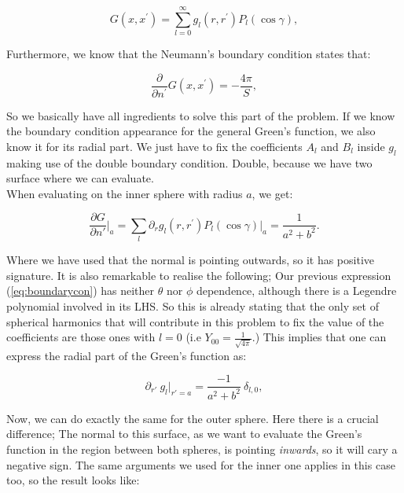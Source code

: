 \begin{equation}\label{eq:Greenfun}
	G\left(x, x^{\prime}\right)=\sum_{l=0}^{\infty} g_{l}\left(r, r^{\prime}\right) P_{l}(\cos \gamma),
\end{equation}

Furthermore, we know that the Neumann's boundary condition states that:

\begin{equation}
	\frac{\partial}{\partial n^{\prime}} G\left(x, x^{\prime}\right)=-\frac{4 \pi}{S},
\end{equation}

So we basically have all ingredients to solve this part of the problem. If we know the boundary condition appearance for the general Green's function, we also know it for its radial part. We just have to fix the coefficients $A_{l}$ and $B_{l}$ inside $g_{l}$ making use of the double boundary condition. Double, because we have two surface where we can evaluate.\\ When evaluating on the inner sphere with radius $a$, we get:
	
\begin{equation}\label{eq:boundarycon}
		\frac{\partial G}{\partial n'}\biggr\rvert_{a} = \sum_{l} \partial_{r} g_{l}(r,r^{\prime}) P_{l}(\cos \gamma) \biggr\rvert_{a} = \frac{1}{a^{2} + b^{2}}.
\end{equation}

Where we have used that the normal is pointing outwards, so it has positive signature. It is also remarkable to realise the following; Our previous expression (\ref{eq:boundarycon}) has neither $\theta$ nor $\phi$ dependence, although there is a Legendre polynomial involved in its LHS. So this is already stating that the only set of spherical harmonics that will contribute in this problem to fix the value of the coefficients are those ones with $l=0$ (i.e $Y_{00} = \tfrac{1}{\sqrt{4 \pi}}$.) This implies that one can express the radial part of the Green's function as:

\begin{equation}\label{eq:innersphere}
		\partial_{r'} \:g_{l}\biggr\rvert_{r'=a} = \frac{-1}{a^{2} + b^{2}}\: \delta_{l,0},
\end{equation}

Now, we can do exactly the same for the outer sphere. Here there is a crucial difference; The normal to this surface, as we want to evaluate the Green's function in the region between both spheres, is pointing \textit{inwards}, so it will cary a negative sign. The same arguments we used for the inner one applies in this case too, so the result looks like:

